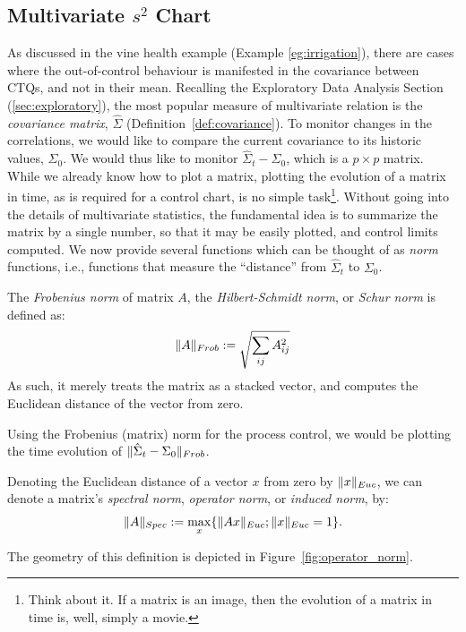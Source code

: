 \subsection[Multivariate s chart]{Multivariate $s^2$ Chart}
\label{sec:multivarite_s}

As discussed in the vine health example (Example \ref{eg:irrigation}), there are cases where the out-of-control behaviour is manifested in the covariance between CTQs, and not in their mean.
Recalling the Exploratory Data Analysis Section (\ref{sec:exploratory}), the most popular measure of multivariate relation is the \emph{covariance matrix}, $\hat{\Sigma}$ (Definition~\ref{def:covariance}).
To monitor changes in the correlations, we would like to compare the current covariance to its historic values, $\Sigma_0$. 
We would thus like to monitor $\hat{\Sigma}_t-\Sigma_0$, which is a $p\times p$ matrix. 
While we already know how to plot a matrix, plotting the evolution of a matrix in time, as is required for a control chart, is no simple task\footnote{Think about it. If a matrix is an image, then the evolution of a matrix in time is, well, simply a movie.}. 
Without going into the details of multivariate statistics, the fundamental idea is to summarize the matrix by a single number, so that it may be easily plotted, and control limits computed. 
We now provide several functions which can be thought of as \emph{norm} functions, i.e., functions that measure the ``distance'' from $\hat{\Sigma}_t$ to $\Sigma_0$. 




\begin{definition}
The \emph{Frobenius norm} of matrix $A$, \aka the \emph{Hilbert-Schmidt norm}, or \emph{Schur norm} is defined as:
\begin{align}
	\Vert A \Vert_{Frob}:= \sqrt{\sum_{ij} A_{ij}^2} 
\end{align}
As such, it merely treats the matrix as a stacked vector, and computes the Euclidean distance of the vector from zero.
\end{definition}
Using the Frobenius (matrix) norm for the process control, we would be plotting the time evolution of $\Vert \hat{\Sigma}_t-\Sigma_0 \Vert_{Frob}$.


\begin{definition}
Denoting the Euclidean distance of a vector $x$ from zero by $\Vert x \Vert_{Euc}$, we can denote a matrix's \emph{spectral norm}, \aka \emph{operator norm}, or \emph{induced norm}, by:
\begin{align}
	\Vert A \Vert_{Spec} := \max_x \{ \Vert Ax \Vert_{Euc}; \Vert x \Vert_{Euc}=1 \}.
\end{align}
\end{definition}
The geometry of this definition is depicted in Figure~\ref{fig:operator_norm}.

